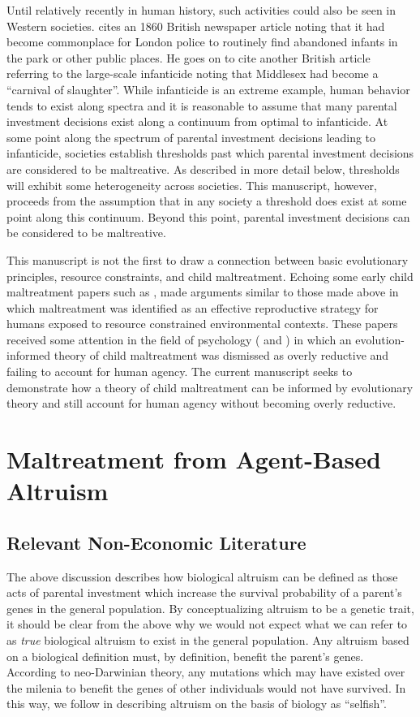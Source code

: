 Until relatively recently in human history, such activities could also be seen in Western societies. \citet{Milner1998} cites an 1860 British newspaper article noting that it had become commonplace for London police to routinely find abandoned infants in the park or other public places. He goes on to cite another British article referring to the large-scale infanticide noting that Middlesex had become a ``carnival of slaughter''. While infanticide is an extreme example, human behavior tends to exist along spectra and it is reasonable to assume that many parental investment decisions exist along a continuum from optimal to infanticide. At some point along the spectrum of parental investment decisions leading to infanticide, societies establish thresholds past which parental investment decisions are considered to be maltreative. As described in more detail below, thresholds will exhibit some heterogeneity across societies. This manuscript, however, proceeds from the assumption that in any society a threshold does exist at some point along this continuum. Beyond this point, parental investment decisions can be considered to be maltreative.

This manuscript is not the first to draw a connection between basic evolutionary principles, resource constraints, and child maltreatment. Echoing some early child maltreatment papers such as \citet{Burgess1978}, \citet{Belsky1991} made arguments similar to those made above in which maltreatment was identified as an effective reproductive strategy for humans exposed to resource constrained
environmental contexts. These papers received some attention in the field of psychology (\citep{Baumrind1993} and \citep{Baumrind1995}) in which an evolution-informed theory of child maltreatment was dismissed as overly reductive and failing to account for human agency. The current manuscript seeks to demonstrate how a theory of child maltreatment can be informed by evolutionary theory and still account for human agency without becoming overly reductive.

\section{Maltreatment from Agent-Based Altruism}

\subsection{Relevant Non-Economic Literature}

The above discussion describes how biological altruism can be defined as those acts of parental investment which increase the survival probability of a parent's genes in the general population. By conceptualizing altruism to be a genetic trait, it should be clear from the above why we would not expect what we can refer to as \emph{true} biological altruism to exist in the general population. Any altruism based on a biological definition must, by definition, benefit the parent's genes. According to neo-Darwinian theory, any mutations which may have existed over the milenia to benefit the genes of other individuals would not have survived. In this way, we follow \citet{Dawkins1976} in describing altruism on the basis of biology as ``selfish''.

